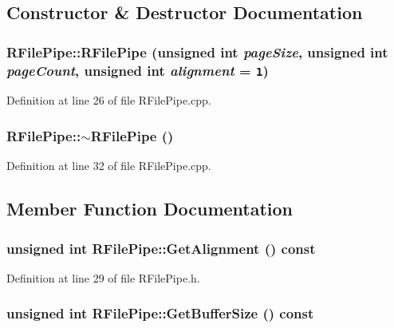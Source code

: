 \subsection{Constructor \& Destructor Documentation}
\hypertarget{class_r_file_pipe_c2106ca425bc38d089de301e7adb517f}{
\subsubsection[{RFilePipe}]{\setlength{\rightskip}{0pt plus 5cm}RFilePipe::RFilePipe (unsigned int {\em pageSize}, \/  unsigned int {\em pageCount}, \/  unsigned int {\em alignment} = {\tt 1})}}
\label{class_r_file_pipe_c2106ca425bc38d089de301e7adb517f}




Definition at line 26 of file RFilePipe.cpp.\hypertarget{class_r_file_pipe_791787ff76d5b2048d9947683f0e3e28}{
\subsubsection[{$\sim$RFilePipe}]{\setlength{\rightskip}{0pt plus 5cm}RFilePipe::$\sim$RFilePipe ()}}
\label{class_r_file_pipe_791787ff76d5b2048d9947683f0e3e28}




Definition at line 32 of file RFilePipe.cpp.

\subsection{Member Function Documentation}
\hypertarget{class_r_file_pipe_97021368b580fc7e8d90646d9a11ea99}{
\subsubsection[{GetAlignment}]{\setlength{\rightskip}{0pt plus 5cm}unsigned int RFilePipe::GetAlignment () const}}
\label{class_r_file_pipe_97021368b580fc7e8d90646d9a11ea99}




Definition at line 29 of file RFilePipe.h.\hypertarget{class_r_file_pipe_b272c2bbe5bcc7610fe9abad3e9ac556}{
\subsubsection[{GetBufferSize}]{\setlength{\rightskip}{0pt plus 5cm}unsigned int RFilePipe::GetBufferSize () const}}
\label{class_r_file_pipe_b272c2bbe5bcc7610fe9abad3e9ac556}




